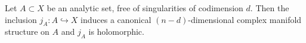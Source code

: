 Let $A \subset X$ be an analytic set, free of singularities of codimension $d$. Then the inclusion $j_A: A \hookrightarrow X$ induces a canonical $(n-d)$-dimensional complex manifold structure on $A$ and $j_A$ is holomorphic.
